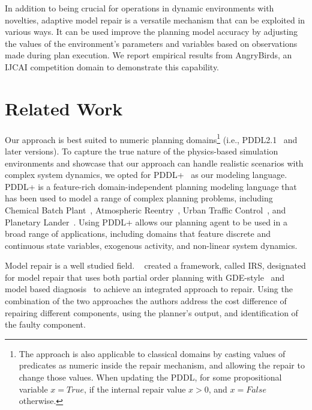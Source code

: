\documentclass[letterpaper]{article} %
\begin{document}
In addition to being crucial for operations in dynamic environments with novelties, adaptive model repair is a versatile mechanism that can be exploited in various ways. It can be used improve the planning model accuracy by adjusting the values of the environment's parameters and variables based on observations made during plan execution. We report empirical results from AngryBirds, an IJCAI competition domain to demonstrate this capability.









\section{Related Work}

Our approach is best suited to numeric planning domains\footnote{The approach is also applicable to classical domains by casting values of predicates as numeric inside the repair mechanism, and allowing the repair to change those values. When updating the PDDL, for some propositional variable $x=True$, if the internal repair value $x>0$, and $x=False$ otherwise.} (i.e., PDDL2.1~\cite{fox2003pddl2} and later versions). To capture the true nature of the physics-based simulation environments and showcase that our approach can handle realistic scenarios with complex system dynamics, we opted for PDDL+~\cite{fox2006modelling} as our modeling language.
PDDL+ is a feature-rich domain-independent planning modeling language that has been used to model a range of complex planning problems, including Chemical Batch Plant~\cite{della2010pddl+}, Atmospheric Reentry~\cite{piotrowski2018heuristics}, Urban Traffic Control~\cite{vallati2016efficient}, and Planetary Lander~\cite{della2010resource}.
Using PDDL+ allows our planning agent to be used in a broad range of applications, including domains that feature discrete and continuous state variables, exogenous activity, and non-linear system dynamics.

Model repair is a well studied field.  ~\citet{sun1993aFramework} created a framework, called IRS, designated for model repair that uses both partial order planning with GDE-style~\cite{dekleer1987diagnosing} and model based diagnosis~\cite{dekleer2003fundamentals} to achieve an integrated approach to repair. Using the combination of the two approaches the authors address the cost difference of repairing different components, using the planner's output, and identification of the faulty component.
\end{document}
